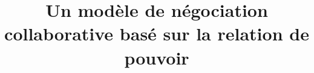 \documentclass[sigconf]{acmart}
\begin{document}
\title{Un modèle de négociation collaborative basé sur la relation de pouvoir }



%












\begin{abstract}

\end{abstract}

%
%





\maketitle




 
\end{document}
